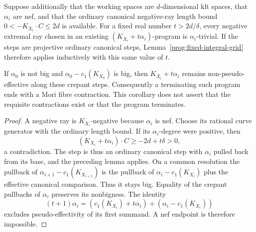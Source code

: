 \begin{corollary}
\label{prog:uniform-canonical-parameter}
Suppose additionally that the working spaces are $d$-dimensional klt
spaces, that $\alpha_i$ are nef, and that the ordinary canonical
negative-ray length bound $0<-K_{X_i}\cdot C\leq2d$ is available.
For a fixed real number $t>2d/\delta$, every negative extremal ray
chosen in an existing $(K_{X_i}+t\alpha_i)$-program is
$\alpha_i$-trivial. If the steps are projective ordinary canonical
steps, Lemma~\ref{prog:fixed-integral-grid} therefore applies
inductively with this same value of $t$.

If $\alpha_0$ is not big and $\alpha_0-c_1(K_{X_0})$ is big, then
$K_{X_i}+t\alpha_i$ remains non-pseudo-effective along these crepant
steps. Consequently a terminating such program ends with a Mori
fibre contraction. This corollary does not assert that the requisite
contractions exist or that the program terminates.
\end{corollary}

\begin{proof}
A negative ray is $K_{X_i}$-negative because $\alpha_i$ is nef. Choose
its rational curve generator with the ordinary length bound. If its
$\alpha_i$-degree were positive, then
\[
 (K_{X_i}+t\alpha_i)\cdot C\geq-2d+t\delta>0,
\]
a contradiction. The step is thus an ordinary canonical step with
$\alpha_i$ pulled back from its base, and the preceding lemma applies.
On a common resolution the pullback of
$\alpha_{i+1}-c_1(K_{X_{i+1}})$ is the pullback of
$\alpha_i-c_1(K_{X_i})$ plus the effective canonical comparison.
Thus it stays big. Equality of the crepant pullbacks of $\alpha_i$
preserves its nonbigness. The
identity
\[
 (t+1)\alpha_i=(c_1(K_{X_i})+t\alpha_i)
                  +(\alpha_i-c_1(K_{X_i}))
\]
excludes pseudo-effectivity of its first summand. A nef endpoint is
therefore impossible.
\end{proof}



